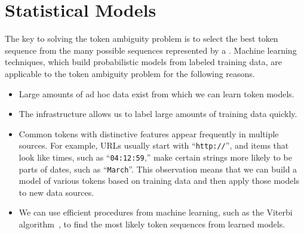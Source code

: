

\section{Statistical Models}\label{sec:stats}


The key to solving the token ambiguity problem is to select the best
token sequence from the many possible sequences represented by a
\seqset{}. Machine learning techniques,
which build probabilistic models from labeled training data,
are applicable to the token ambiguity problem for the following reasons.

\begin{itemize}
\item Large amounts of ad hoc data exist from which we can learn token models.
\item The \pads{} infrastructure allows us to label large amounts of training data quickly.
\item Common tokens with distinctive features appear frequently in
  multiple sources.  For example, URLs usually start with  ``\texttt{http://}'',
  and items that look like times, such as ``\texttt{04:12:59},'' make
  certain strings more likely to be parts of dates, such as
  ``{\tt March}''.  This observation means that we can build a
  model of various tokens based on training data and then apply those
  models to new data sources.
\item We can use efficient procedures from machine learning, such as
  the Viterbi algorithm~\cite{rabiner89:hmm}, to find the most likely token
  sequences from learned models.
\end{itemize}

